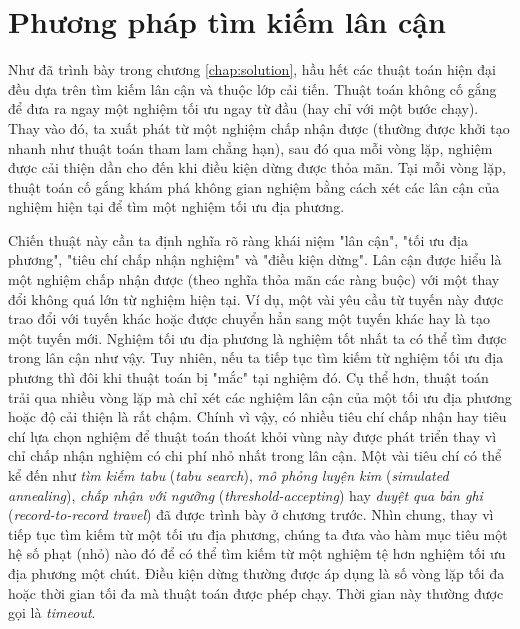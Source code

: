\chapter{Phương pháp tìm kiếm lân cận}
\label{chap:search}

Như đã trình bày trong chương \ref{chap:solution}, hầu hết các thuật toán hiện đại đều dựa trên tìm kiếm lân cận và thuộc lớp cải tiến. Thuật toán không cố gắng để đưa ra ngay một nghiệm tối ưu ngay từ đầu (hay chỉ với một bước chạy). Thay vào đó, ta xuất phát từ một nghiệm chấp nhận được (thường được khởi tạo nhanh như thuật toán tham lam chẳng hạn), sau đó qua mỗi vòng lặp, nghiệm được cải thiện dần cho đến khi điều kiện dừng được thỏa mãn. Tại mỗi vòng lặp, thuật toán cố gắng khám phá không gian nghiệm bằng cách xét các lân cận của nghiệm hiện tại để tìm một nghiệm tối ưu địa phương. 

Chiến thuật này cần ta định nghĩa rõ ràng khái niệm "lân cận", "tối ưu địa phương", "tiêu chí chấp nhận nghiệm" và "điều kiện dừng". Lân cận được hiểu là một nghiệm chấp nhận được (theo nghĩa thỏa mãn các ràng buộc) với một thay đổi không quá lớn từ nghiệm hiện tại. Ví dụ, một vài yêu cầu từ tuyến này được trao đổi với tuyến khác hoặc được chuyển hẳn sang một tuyến khác hay là tạo một tuyến mới. Nghiệm tối ưu địa phương là nghiệm tốt nhất ta có thể tìm được trong lân cận như vậy. Tuy nhiên, nếu ta tiếp tục tìm kiếm từ nghiệm tối ưu địa phương thì đôi khi thuật toán bị "mắc" tại nghiệm đó. Cụ thể hơn, thuật toán trải qua nhiều vòng lặp mà chỉ xét các nghiệm lân cận của một tối ưu địa phương hoặc độ cải thiện là rất chậm. Chính vì vậy, có nhiều tiêu chí chấp nhận hay tiêu chí lựa chọn nghiệm để thuật toán thoát khỏi vùng này được phát triển thay vì chỉ chấp nhận nghiệm có chi phí nhỏ nhất trong lân cận. Một vài tiêu chí có thể kể đến như \textit{tìm kiếm tabu} (\textit{tabu search}), \textit{mô phỏng luyện kim} (\textit{simulated annealing}), \textit{chấp nhận với ngưỡng} (\textit{threshold-accepting}) hay \textit{duyệt qua bản ghi} (\textit{record-to-record travel}) đã được trình bày ở chương trước. Nhìn chung, thay vì tiếp tục tìm kiếm từ một tối ưu địa phương, chúng ta đưa vào hàm mục tiêu một hệ số phạt (nhỏ) nào đó để có thể tìm kiếm từ một nghiệm tệ hơn nghiệm tối ưu địa phương một chút. Điều kiện dừng thường được áp dụng là số vòng lặp tối đa hoặc thời gian tối đa mà thuật toán được phép chạy. Thời gian này thường được gọi là \textit{timeout}.


